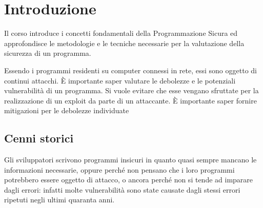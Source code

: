 \chapter{Introduzione}
Il corso introduce i concetti fondamentali della
Programmazione Sicura
ed approfondisce le metodologie e
le tecniche necessarie per la
valutazione della sicurezza di un programma.

Essendo i programmi residenti su computer connessi
in rete, essi sono oggetto di continui attacchi. È importante saper valutare le debolezze e le
potenziali vulnerabilità di un programma. Si vuole evitare che esse vengano sfruttate per la
realizzazione di un exploit da parte di un attaccante. È importante saper fornire mitigazioni per le
debolezze individuate

\section{Cenni storici}
Gli sviluppatori scrivono programmi insicuri in quanto quasi sempre mancano le informazioni necessarie, oppure perché non pensano che i loro programmi potrebbero essere oggetto di attacco, o ancora perché non si tende ad imparare dagli errori: infatti molte vulnerabilità sono state causate dagli stessi errori ripetuti negli ultimi quaranta anni.

\vspace{4mm}

